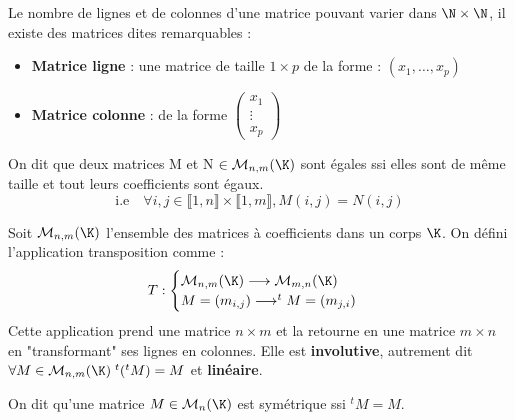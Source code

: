 \begin{proposition}
    Le nombre de lignes et de colonnes d'une matrice pouvant varier dans $\N \times \N$, il existe des 
    matrices dites remarquables : 
    \begin{itemize}
        \item \textbf{Matrice ligne} : une matrice de taille $ 1 \times p$ de la forme : $(x_1, \dots, x_p)$ 
        \item \textbf{Matrice colonne} : de la forme 
        $ \begin{pmatrix}
            x_1 \\ 
            \vdots \\ 
            x_p 
        \end{pmatrix}$ 
    \end{itemize} 
\end{proposition}

\begin{proposition}
    On dit que deux matrices M et N $ \in \mathcal{M}_{n,m}(\K)$ sont égales ssi elles sont de même taille et 
    tout leurs coefficients sont égaux. 
        \[ \text{i.e} \quad \forall i,j \in \llbracket 1, n \rrbracket \times \llbracket 1, m \rrbracket, M(i,j) = N(i,j) \]  
\end{proposition}

\begin{definition}[Transposition]
    Soit $ \mathcal{M}_{n,m}(\K)$ l'ensemble des matrices à coefficients dans un corps $\K$. 
    On défini l'application transposition comme : 
        \[ T : 
            \begin{cases}
                \mathcal{M}_{n,m}(\K) \longrightarrow \mathcal{M}_{m,n}(\K) \\ 
                M = (m_{i,j}) \longrightarrow ^t M = (m_{j,i})
            \end{cases} \]
    Cette application prend une matrice $ n \times m$ et la retourne en une matrice $ m \times n $ en "transformant"
    ses lignes en colonnes. 
    Elle est \textbf{involutive}, autrement dit $ \forall M \in \mathcal{M}_{n,m}(\K) \; ^t (^t M) = M$ 
    et \textbf{linéaire}. 
\end{definition}

\begin{definition}
    On dit qu'une matrice $M \in \mathcal{M}_{n}(\K)$ est symétrique ssi $^tM = M$. 
\end{definition}



